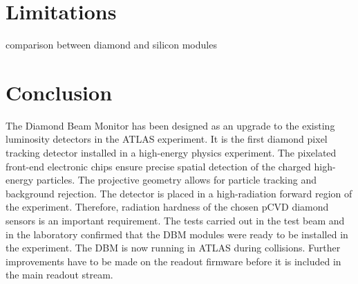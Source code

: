 \documentclass[12pt]{packages/mytustyle}  %
\begin{document}
\section{Limitations}
\label{sec:limitations}

comparison between diamond and silicon modules

\section{Conclusion}
\label{sec:limitations}
The Diamond Beam Monitor has been designed as an upgrade to the existing luminosity detectors in the ATLAS experiment. It is the first diamond pixel tracking detector installed in a high-energy physics experiment. The pixelated front-end electronic chips ensure precise spatial detection of the charged high-energy particles. The projective geometry allows for particle tracking and background rejection. The detector is placed in a high-radiation forward region of the experiment. Therefore, radiation hardness of the chosen pCVD diamond sensors is an important requirement. The tests carried out in the test beam and in the laboratory confirmed that the DBM modules were ready to be installed in the experiment. The DBM is now running in ATLAS during collisions. Further improvements have to be made on the readout firmware before it is included in the main readout stream. 





\end{document}
